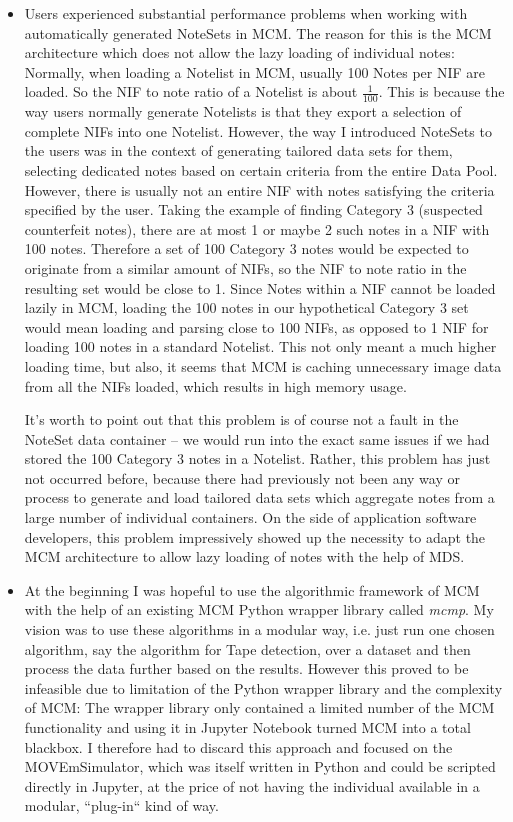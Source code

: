 \begin{itemize}
	\item Users experienced substantial performance problems when working with automatically generated NoteSets in MCM. The reason for this is the MCM architecture which does not allow the lazy loading of individual notes: Normally, when loading a Notelist in MCM, usually 100 Notes per NIF are loaded. So the NIF to note ratio of a Notelist is about $\frac{1}{100}$. This is because the way users  normally generate Notelists is that they export a selection of complete NIFs into one Notelist. However, the way I introduced NoteSets to the users was in the context of generating tailored data sets for them, selecting dedicated notes based on certain criteria from the entire Data Pool. However, there is usually not an entire NIF with notes satisfying the criteria specified by the user. Taking the example of finding Category 3 (suspected counterfeit notes), there are at most 1 or maybe 2 such notes in a NIF with 100 notes. Therefore a set of 100 Category 3 notes would be expected to originate from a similar amount of NIFs, so the NIF to note ratio in the resulting set would be close to 1. Since Notes within a NIF cannot be loaded lazily in MCM, loading the 100 notes in our hypothetical Category 3 set would mean loading and parsing close to 100 NIFs, as opposed to 1 NIF for loading 100 notes in a standard Notelist. This not only meant a much higher loading time, but also, it seems that MCM is caching unnecessary image data from all the NIFs loaded, which results in high memory usage. \par
It's worth to point out that this problem is of course not a fault in the NoteSet data container -- we would run into the exact same issues if we had stored the 100 Category 3 notes in a Notelist. Rather, this problem has just not occurred before, because there had previously not been any way or process to generate and load tailored data sets which aggregate notes from a large number of individual containers. On the side of application software developers, this problem impressively showed up the necessity to adapt the MCM architecture to allow lazy loading of notes with the help of MDS. 
\item At the beginning I was hopeful to use the algorithmic framework of MCM with the help of an existing MCM Python wrapper library called \emph{mcmp}. My vision was to use these algorithms in a modular way, i.e. just run one chosen algorithm, say the algorithm for Tape detection, over a dataset and then process the data further based on the results. However this proved to be infeasible due to limitation of the Python wrapper library and the complexity of MCM: The wrapper library only contained a limited number of the MCM functionality and using it in Jupyter Notebook turned MCM into a total blackbox. I therefore had to discard this approach and focused on the MOVEmSimulator, which was itself written in Python and could be scripted directly in Jupyter, at the price of not having the individual available in a modular, ``plug-in`` kind of way. 
\end{itemize}

